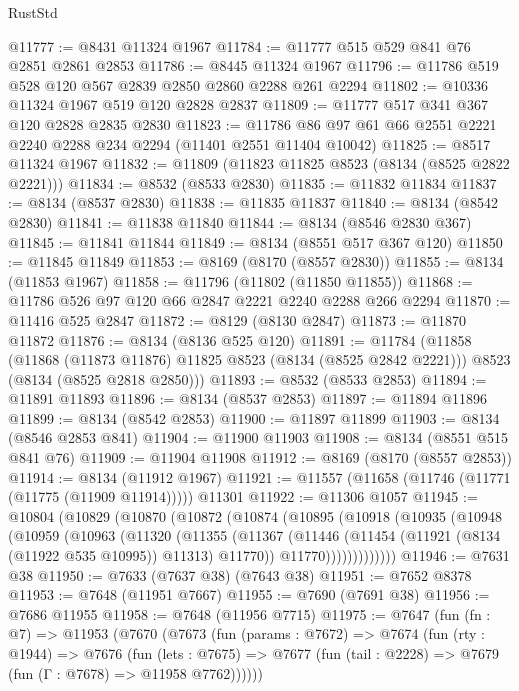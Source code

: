 \begin{lexlean}{RustStd}
\begin{coremodule}
@11777 := @8431 @11324 @1967
@11784 := @11777 @515 @529 @841 @76 @2851 @2861 @2853
@11786 := @8445 @11324 @1967
@11796 := @11786 @519 @528 @120 @567 @2839 @2850 @2860 @2288 @261 @2294
@11802 := @10336 @11324 @1967 @519 @120 @2828 @2837
@11809 := @11777 @517 @341 @367 @120 @2828 @2835 @2830
@11823 := @11786 @86 @97 @61 @66 @2551 @2221 @2240 @2288 @234 @2294 (@11401 @2551 @11404 @10042)
@11825 := @8517 @11324 @1967
@11832 := @11809 (@11823 @11825 @8523 (@8134 (@8525 @2822 @2221)))
@11834 := @8532 (@8533 @2830)
@11835 := @11832 @11834
@11837 := @8134 (@8537 @2830)
@11838 := @11835 @11837
@11840 := @8134 (@8542 @2830)
@11841 := @11838 @11840
@11844 := @8134 (@8546 @2830 @367)
@11845 := @11841 @11844
@11849 := @8134 (@8551 @517 @367 @120)
@11850 := @11845 @11849
@11853 := @8169 (@8170 (@8557 @2830))
@11855 := @8134 (@11853 @1967)
@11858 := @11796 (@11802 (@11850 @11855))
@11868 := @11786 @526 @97 @120 @66 @2847 @2221 @2240 @2288 @266 @2294
@11870 := @11416 @525 @2847
@11872 := @8129 (@8130 @2847)
@11873 := @11870 @11872
@11876 := @8134 (@8136 @525 @120)
@11891 := @11784
    (@11858
      (@11868 (@11873 @11876) @11825 @8523 (@8134 (@8525 @2842 @2221)))
      @8523
      (@8134 (@8525 @2818 @2850)))
@11893 := @8532 (@8533 @2853)
@11894 := @11891 @11893
@11896 := @8134 (@8537 @2853)
@11897 := @11894 @11896
@11899 := @8134 (@8542 @2853)
@11900 := @11897 @11899
@11903 := @8134 (@8546 @2853 @841)
@11904 := @11900 @11903
@11908 := @8134 (@8551 @515 @841 @76)
@11909 := @11904 @11908
@11912 := @8169 (@8170 (@8557 @2853))
@11914 := @8134 (@11912 @1967)
@11921 := @11557 (@11658 (@11746 (@11771 (@11775 (@11909 @11914))))) @11301
@11922 := @11306 @1057
@11945 := @10804
    (@10829
      (@10870
        (@10872
          (@10874
            (@10895
              (@10918
                (@10935
                  (@10948
                    (@10959
                      (@10963
                        (@11320
                          (@11355
                            (@11367
                              (@11446 (@11454 (@11921 (@8134 (@11922 @535 @10995)) @11313) @11770))
                              @11770)))))))))))))
@11946 := @7631 @38
@11950 := @7633 (@7637 @38) (@7643 @38)
@11951 := @7652 @8378
@11953 := @7648 (@11951 @7667)
@11955 := @7690 (@7691 @38)
@11956 := @7686 @11955
@11958 := @7648 (@11956 @7715)
@11975 := @7647
    (fun (fn : @7) =>
    @11953
      (@7670
        (@7673
          (fun (params : @7672) =>
          @7674
            (fun (rty : @1944) =>
            @7676
              (fun (lets : @7675) =>
              @7677 (fun (tail : @2228) => @7679 (fun (Γ : @7678) => @11958 @7762))))))

\end{coremodule}
\end{lexlean}
